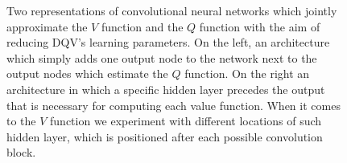 \begin{figure}[ht!]
\caption{Two representations of convolutional neural networks which jointly approximate the $V$ function and the $Q$ function with the aim of reducing DQV's learning parameters. On the left, an architecture which simply adds one output node to the network next to the output nodes which estimate the $Q$ function. On the right an architecture in which a specific hidden layer precedes the output that is necessary for computing each value function. When it comes to the $V$ function we experiment with different locations of such hidden layer, which is positioned after each possible convolution block.}
\end{figure}

